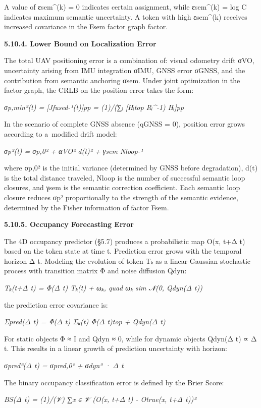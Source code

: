 \documentclass[
]{article}
\begin{document}
A value of εsem\^{}(k) = 0 indicates certain assignment, while
εsem\^{}(k) = log C indicates maximum semantic uncertainty. A token with
high εsem\^{}(k) receives increased covariance in the Fsem factor graph
factor.

\textbf{5.10.4. Lower Bound on Localization Error}

The total UAV positioning error is a combination of: visual odometry
drift σVO, uncertainty arising from IMU integration σIMU, GNSS error
σGNSS, and the contribution from semantic anchoring σsem. Under joint
optimization in the factor graph, the CRLB on the position error takes
the form:

\emph{σp,min²(t) = {[}Jfused-¹(t){]}pp = (1)/(∑ᵢ {[}Hᵢtop Rᵢ\^{}-1)
Hᵢ{]}pp}

In the scenario of complete GNSS absence (qGNSS = 0), position error
grows according to a~modified drift model:

\emph{σp²(t) = σp,0² + αVO² d(t)² + γsem Nloop-¹}

where σp,0² is the initial variance (determined by GNSS before
degradation), d(t) is the total distance traveled, Nloop is the number
of successful semantic loop closures, and γsem is the semantic
correction coefficient. Each semantic loop closure reduces σp²
proportionally to the strength of the semantic evidence, determined by
the Fisher information of factor Fsem.

\textbf{5.10.5. Occupancy Forecasting Error}

The 4D occupancy predictor (§5.7) produces a probabilistic map O(x, t+Δ
t) based on the token state at time t. Prediction error grows with the
temporal horizon Δ t. Modeling the evolution of token Tₖ as a
linear-Gaussian stochastic process with transition matrix Φ and noise
diffusion Qdyn:

\emph{Tₖ(t+Δ t) = Φ(Δ t) Tₖ(t) + ωₖ, quad ωₖ sim 𝒩(0, Qdyn(Δ t))}

the prediction error covariance is:

\emph{Σpred(Δ t) = Φ(Δ t) Σₖ(t) Φ(Δ t)top + Qdyn(Δ t)}

For static objects Φ ≈ I and Qdyn ≈ 0, while for dynamic objects Qdyn(Δ
t) ∝ Δ t. This results in a linear growth of prediction uncertainty with
horizon:

\emph{σpred²(Δ t) = σpred,0² + σdyn² · Δ t}

The binary occupancy classification error is defined by the Brier Score:

\emph{BS(Δ t) = (1)/(\textbar 𝒱\textbar) ∑x ∈ 𝒱 (O(x, t+Δ t) - Otrue(x,
t+Δ t))²}
\end{document}
